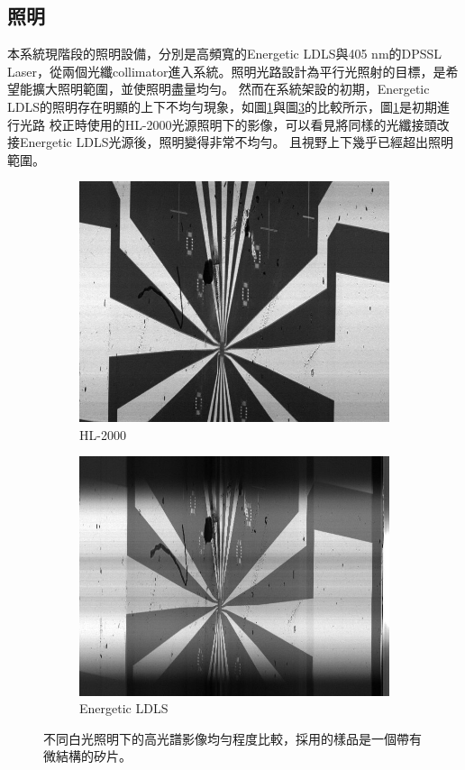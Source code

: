 \documentclass[12pt]{article}
\begin{document}
\subsection{照明}
本系統現階段的照明設備，分別是高頻寬的Energetic LDLS與405 nm的DPSSL Laser，從兩個光纖collimator進入系統。照明光路設計為平行光照射的目標，是希望能擴大照明範圍，並使照明盡量均勻。
然而在系統架設的初期，Energetic LDLS的照明存在明顯的上下不均勻現象，如圖\ref{fig: hl2000}與圖\ref{fig: energetic}的比較所示，圖\ref{fig: hl2000}是初期進行光路
校正時使用的HL-2000光源照明下的影像，可以看見將同樣的光纖接頭改接Energetic LDLS光源後，照明變得非常不均勻。
且視野上下幾乎已經超出照明範圍。
\begin{figure}
    \centering
    \begin{subfigure}[b]{0.45\textwidth}
        \includegraphics[width=\linewidth]{0831focusForOmFullScanHL2000Scaled.jpg}
        \caption{HL-2000}
        \label{fig: hl2000}
    \end{subfigure}
    \begin{subfigure}[b]{0.45\textwidth}
        \includegraphics[width=\linewidth]{0909Energetic.jpg}
        \caption{Energetic LDLS}
        \label{fig: energetic}
    \end{subfigure}
    \caption[不同白光照明下的高光譜影像均勻程度比較]{不同白光照明下的高光譜影像均勻程度比較，採用的樣品是一個帶有微結構的矽片。}
\end{figure}  
\end{document}
